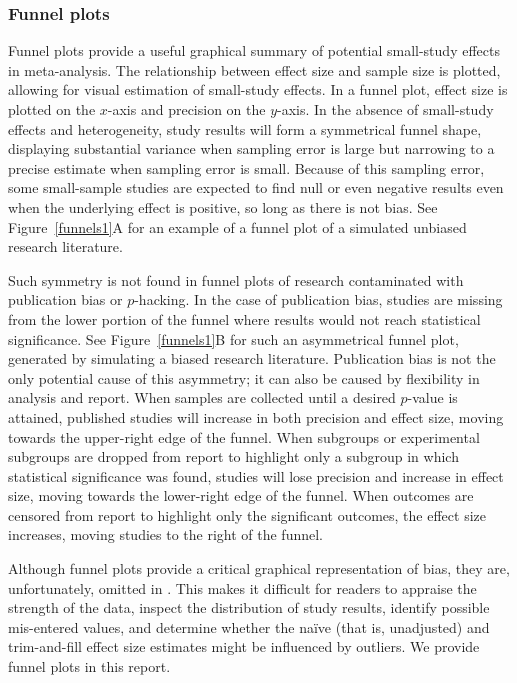\documentclass[man, mask]{apa6}
\begin{document}
\subsubsection{Funnel plots}
Funnel plots provide a useful graphical summary of potential small-study effects in meta-analysis.  The relationship between effect size and sample size is plotted, allowing for visual estimation of small-study effects. In a funnel plot, effect size is plotted on the $x$-axis and precision on the $y$-axis. In the absence of small-study effects and heterogeneity, study results will form a symmetrical funnel shape, displaying substantial variance when sampling error is large but narrowing to a precise estimate when sampling error is small. Because of this sampling error, some small-sample studies are expected to find null or even negative results even when the underlying effect is positive, so long as there is not bias. See Figure~\ref{funnels1}A for an example of a funnel plot of a simulated unbiased research literature.

Such symmetry is not found in funnel plots of research contaminated with publication bias or $p$-hacking.  In the case of publication bias, studies are missing from the lower portion of the funnel where results would not reach statistical significance. See Figure~\ref{funnels1}B for such an asymmetrical funnel plot, generated by simulating a biased research literature. Publication bias is not the only potential cause of this asymmetry; it can also be caused by flexibility in analysis and report. When samples are collected until a desired $p$-value is attained, published studies will increase in both precision and effect size, moving towards the upper-right edge of the funnel. When subgroups or experimental subgroups are dropped from report to highlight only a subgroup in which statistical significance was found, studies will lose precision and increase in effect size, moving towards the lower-right edge of the funnel. When outcomes are censored from report to highlight only the significant outcomes, the effect size increases, moving studies to the right of the funnel.   %

Although funnel plots provide a critical graphical representation of bias, they are, unfortunately, omitted in \citet{Anderson:etal:2010}.  This makes it difficult for readers to appraise the strength of the data, inspect the distribution of study results, identify possible mis-entered values, and determine whether the na{\"i}ve (that is, unadjusted) and trim-and-fill effect size estimates might be influenced by outliers. We provide funnel plots in this report. 
\end{document}
